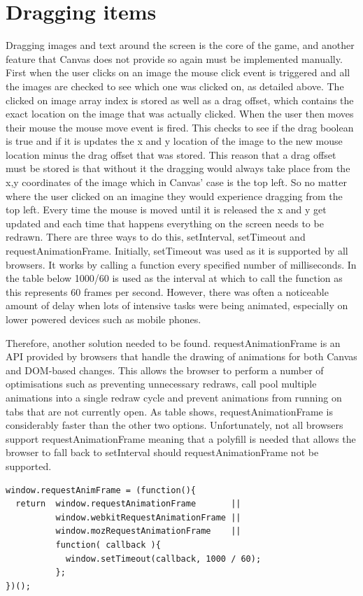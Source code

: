 \documentclass[12pt,a4paper]{report}
\begin{document}
\section{Dragging items}
Dragging images and text around the screen is the core of the game, and another feature that Canvas does not provide so again must be implemented manually. 
First when the user clicks on an image the mouse click event is triggered and all the images are checked to see which one was clicked on, as detailed above. The clicked on image array index is stored as well as a drag offset, which contains the exact location on the image that was actually clicked.
When the user then moves their mouse the mouse move event is fired. This checks to see if the drag boolean is true and if it is updates the x and y location of the image to the new mouse location minus the drag offset that was stored. This reason that a drag offset must be stored is that without it the dragging would always take place from the x,y coordinates of the image which in Canvas' case is the top left. So no matter where the user clicked on an imagine they would experience dragging from the top left. Every time the mouse is moved until it is released the x and y get updated and each time that happens everything on the screen needs to be redrawn. 
There are three ways to do this, setInterval, setTimeout and requestAnimationFrame. Initially, setTimeout was used as it is supported by all browsers. It works by calling a function every specified number of milliseconds. In the table below 1000/60 is used as the interval at which to call the function as this represents 60 frames per second. However, there was often a noticeable amount of delay when lots of intensive tasks were being animated, especially on lower powered devices such as mobile phones.

Therefore, another solution needed to be found. requestAnimationFrame is an API provided by browsers that handle the drawing of animations for both Canvas and DOM-based changes. This allows the browser to perform a number of optimisations such as preventing unnecessary redraws, call pool multiple animations into a single redraw cycle and prevent animations from running on tabs that are not currently open. As table shows, requestAnimationFrame is considerably faster than the other two options. Unfortunately, not all browsers support requestAnimationFrame meaning that a polyfill is needed that allows the browser to fall back to setInterval should requestAnimationFrame not be supported.

\begin{lstlisting}
window.requestAnimFrame = (function(){
  return  window.requestAnimationFrame       ||
          window.webkitRequestAnimationFrame ||
          window.mozRequestAnimationFrame    ||
          function( callback ){
            window.setTimeout(callback, 1000 / 60);
          };
})();
\end{lstlisting}
\end{document}
